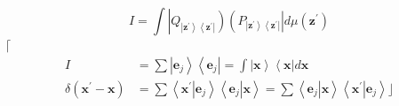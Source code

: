 \documentclass[aps,preprint]{revtex4}%
\begin{document}
\begin{equation}
I=\int\left\vert Q_{\left\vert \mathbf{z}^{\prime}\right\rangle \left\langle
\mathbf{z}^{\prime}\right\vert }\right)  \left(  P_{\left\vert \mathbf{z}%
^{\prime}\right\rangle \left\langle \mathbf{z}^{\prime}\right\vert
}\right\vert d\mu\left(  \mathbf{z}^{\prime}\right)
\end{equation}
$\lceil$%
\begin{align}
I  &  =\sum\left\vert \mathbf{e}_{j}\right\rangle \left\langle \mathbf{e}%
_{j}\right\vert =\int\left\vert \mathbf{x}\right\rangle \left\langle
\mathbf{x}\right\vert d\mathbf{x}\\
\delta\left(  \mathbf{x}^{\prime}-\mathbf{x}\right)   &  =\sum\left\langle
\left.  \mathbf{x}^{\prime}\right\vert \mathbf{e}_{j}\right\rangle
\left\langle \left.  \mathbf{e}_{j}\right\vert \mathbf{x}\right\rangle
=\sum\left\langle \left.  \mathbf{e}_{j}\right\vert \mathbf{x}\right\rangle
\left\langle \left.  \mathbf{x}^{\prime}\right\vert \mathbf{e}_{j}%
\right\rangle \rfloor
\end{align}
\end{document}
